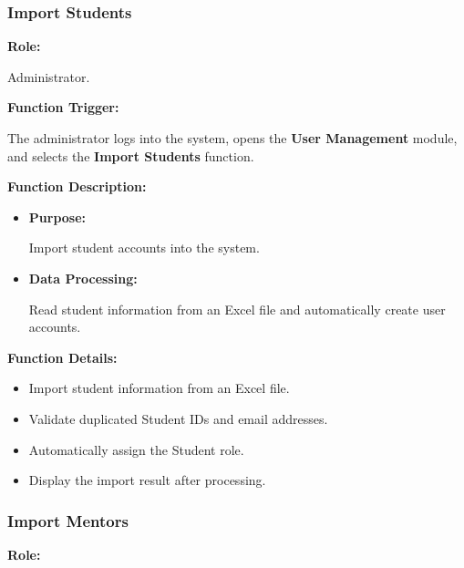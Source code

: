 \subsubsection{Import Students}

\textbf{Role:}

Administrator.

\vspace{0.3cm}

\textbf{Function Trigger:}

The administrator logs into the system, opens the \textbf{User Management} module, and selects the \textbf{Import Students} function.

\vspace{0.3cm}

\textbf{Function Description:}

\begin{itemize}
    \item \textbf{Purpose:}

    Import student accounts into the system.

    \item \textbf{Data Processing:}

    Read student information from an Excel file and automatically create user accounts.
\end{itemize}

\vspace{0.3cm}

\textbf{Function Details:}

\begin{itemize}
    \item Import student information from an Excel file.

    \item Validate duplicated Student IDs and email addresses.

    \item Automatically assign the Student role.

    \item Display the import result after processing.
\end{itemize}


\subsubsection{Import Mentors}

\textbf{Role:}

